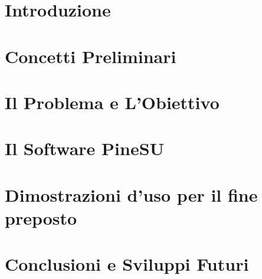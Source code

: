 \documentclass[12pt,a4paper]{report}
\begin{document}
\chapter{Introduzione}



\chapter{Concetti Preliminari}



\chapter{Il Problema e L'Obiettivo}



\chapter{Il Software PineSU}



\chapter{Dimostrazioni d'uso per il fine preposto}



\chapter{Conclusioni e Sviluppi Futuri}






\cleardoublepage{} %
\end{document}
